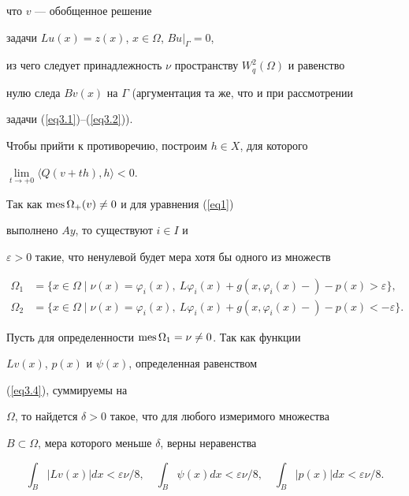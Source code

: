 что $v$ --- обобщенное решение


задачи $Lu(x) = z(x)$, $x \in \Omega$, $Bu |_\Gamma=0$,


из чего следует принадлежность $\nu$ пространству $W^2_q(\Omega)$ и равенство


нулю следа $B v(x)$ на $\Gamma$ (аргументация та же, что и при рассмотрении


задачи (\ref{eq3.1})--(\ref{eq3.2})).





Чтобы прийти к противоречию, построим $h \in X$, для которого


$\lim\limits_{t \to +0}\langle Q(v+th),h \rangle <0$.


Так как $\operatorname{mes}\Omega_{+}(v) \ne 0$ и для уравнения (\ref{eq1})


выполнено $Ay$, то существуют $i \in I$ и


$\varepsilon > 0$ такие, что ненулевой будет мера хотя бы одного из множеств


\begin{align*}


\Omega_1 &= \{ x\in \Omega \mid \nu(x)=\varphi_i(x),\ L\varphi_i(x)+


g(x,\varphi_i(x)-)-p(x) > \varepsilon\}, \\


%


\Omega_2 &= \{ x\in \Omega \mid \nu(x)=\varphi_i(x),\ L\varphi_i(x)+


g(x,\varphi_i(x)-)-p(x) < -\varepsilon\}.


\end{align*}


Пусть для определенности $\operatorname{mes}\Omega_1=\nu \ne 0$. Так как функции


$L v(x)$, $p(x)$ и $\psi(x)$, определенная равенством


(\ref{eq3.4}), суммируемы на


$\Omega$, то найдется $\delta>0$ такое, что для любого измеримого множества


$B \subset \Omega$, мера которого меньше $\delta$, верны неравенства


\begin{equation}


\int_B |L v(x)| dx<\varepsilon\nu/8,\quad


\int_B \psi(x) dx<\varepsilon\nu/8,\quad


\int_B |p(x)| dx<\varepsilon\nu/8.\label{eq3.5}


\end{equation}


